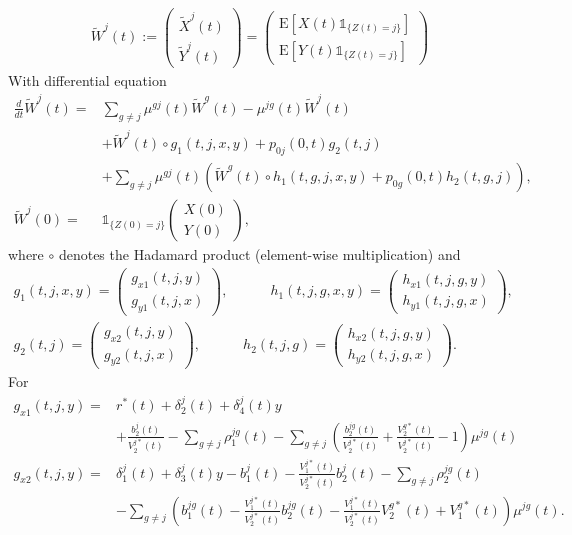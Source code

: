\documentclass[12pt]{article}
\newcommand{\E}{\text{E}}
\newcommand{\indic}[1]{\mathds{1}_{ \{ #1 \} }}
\theoremstyle{my_thm}
\begin{document}
\begin{align*}
\tilde{W}^j(t):=
\begin{pmatrix}
\tilde{X}^j(t) \\
\tilde{Y}^j(t)
\end{pmatrix}
=
\begin{pmatrix}
\E[ X(t) \indic{Z(t)=j}] \\
\E[ Y(t) \indic{Z(t)=j}]
\end{pmatrix}
\end{align*}
With differential equation
\begin{align*}
\frac{d}{dt}\tilde{W}^j(t)=&
\sum_{g\neq j} \mu^{gj}(t) \tilde{W}^g(t) - \mu^{jg}(t) \tilde{W}^j(t)
\\
&+ \tilde{W}^j(t) \circ g_1(t,j,x,y)+p_{0j}(0,t) g_2(t,j)
\\
&+ \sum_{g \neq j} \mu^{gj}(t) \left( \tilde{W}^g(t) \circ h_1(t,g,j,x,y)+ p_{0g}(0,t) h_2(t,g,j) \right),
\\
\tilde{W}^j(0)=&\indic{Z(0)=j} \begin{pmatrix}
X(0)\\
Y(0)
\end{pmatrix},
\end{align*}
where $\circ$ denotes the Hadamard product (element-wise multiplication) and
\begin{gather*}
g_1(t,j,x,y)=\begin{pmatrix}
g_{x1}(t,j,y) \\
g_{y1}(t,j,x)
\end{pmatrix},
\qquad 
\quad
h_1(t,j,g,x,y)=\begin{pmatrix}
h_{x1}(t,j,g,y) \\
h_{y1}(t,j,g,x)
\end{pmatrix},
\\
g_2(t,j)=\begin{pmatrix}
g_{x2}(t,j,y) \\
g_{y2}(t,j,x)
\end{pmatrix},
\qquad 
\quad
h_2(t,j,g)=\begin{pmatrix}
h_{x2}(t,j,g,y) \\
h_{y2}(t,j,g,x)
\end{pmatrix}.
\end{gather*}
For 
\begin{align*}
g_{x1}(t,j,y)=&r^*(t)  +\delta_2^j(t)+\delta_4^j(t)y\\
&+\frac{b^j_2(t)}{V_2^{j*}(t)}
-\sum_{g \neq j} \rho_1^{jg}(t)
-\sum_{g \neq j} \left(\frac{b^{jg}_2(t)}{V_2^{j*}(t)} + \frac{V^{g*}_2(t)}{V^{j*}_2(t)}-1 \right) \mu^{jg}(t)
\\
g_{x2}(t,j,y)=& \delta_1^j(t)
+\delta_3^j(t)y
-b_1^j(t)
-\frac{V_1^{j*}(t)}{V_2^{j*}(t)}b^j_2(t)
-\sum_{g \neq j} \rho_2^{jg}(t)
\\
&-\sum_{g \neq j} \left( b_1^{jg}(t)-\frac{V_1^{j*}(t)}{V_2^{j*}(t)}b^{jg}_2(t) -\frac{V^{j*}_1(t)}{V^{j*}_2(t)}V^{g*}_2(t)+V^{g*}_1(t) \right) \mu^{jg}(t).
\end{align*}
\end{document}

